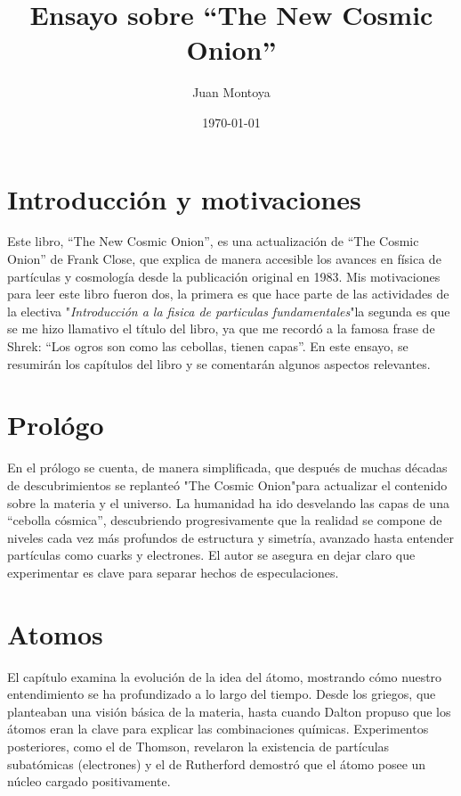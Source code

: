 \documentclass[12pt]{article}
\title{Ensayo sobre “The New Cosmic Onion”}
\author{Juan Montoya}
\date{\today}
\begin{document}
\maketitle

\section{Introducción y motivaciones}
Este libro, “The New Cosmic Onion”, es una actualización de “The Cosmic Onion” de Frank Close, que explica de manera accesible los avances en física de partículas y cosmología desde la publicación original en 1983. Mis motivaciones para leer este libro fueron dos, la primera\newcommand{\comment}[1]{}\comment{se desespera, se encojona si se lo hecho afuera} es que hace parte de las actividades de la electiva "\textit{Introducción a la fisica de particulas fundamentales}"la segunda es que se me hizo llamativo el título del libro, ya que me recordó a la famosa frase de Shrek: “Los ogros son como las cebollas, tienen capas”. En este ensayo, se resumirán los capítulos del libro y se comentarán algunos aspectos relevantes.

\section{Prológo}
En el prólogo se cuenta, de manera simplificada, que después de muchas décadas de descubrimientos se replanteó "The Cosmic Onion"\text{ }para actualizar el contenido sobre la materia y el universo. La humanidad ha ido desvelando las capas de una “cebolla cósmica”, descubriendo progresivamente que la realidad se compone de niveles cada vez más profundos de estructura y simetría,  avanzado hasta entender partículas como cuarks y electrones. El autor se asegura en dejar claro que experimentar es clave para separar hechos de especulaciones.

\section{Atomos}
El capítulo examina la evolución de la idea del átomo, mostrando cómo nuestro entendimiento se ha profundizado a lo largo del tiempo. Desde los griegos, que planteaban una visión básica de la materia, hasta cuando Dalton propuso que los átomos eran la clave para explicar las combinaciones químicas. Experimentos posteriores, como el de Thomson, revelaron la existencia de partículas subatómicas (electrones) y el de Rutherford demostró que el átomo posee un núcleo cargado positivamente.
\end{document}
